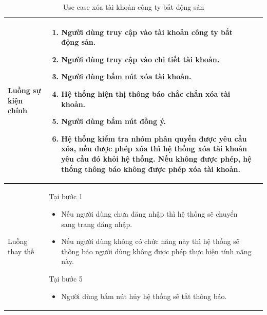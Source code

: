 \documentclass[12pt,a4paper]{article}
\begin{document}
\begin{table}[H]
\begin{tabular}{|p{3.5cm}|p{11.5cm}|c|}
            Luồng sự kiện chính & \vspace{-.8cm}\begin{enumerate}
                                                    \item Người dùng truy cập vào tài khoản công ty bất động sản.
                                                    \item Người dùng truy cập vào chi tiết tài khoản.
                                                    \item  Người dùng bấm nút xóa tài khoản.
                                                    \item  Hệ thống hiện thị thông báo chắc chắn xóa tài khoản.
                                                    \item  Người dùng bấm nút đồng ý.
                                                    \item Hệ thống kiểm tra nhóm phân quyền được yêu cầu xóa, nếu được phép xóa thì hệ thống xóa tài khoản yêu cầu đó khỏi hệ thống. Nếu không được phép, hệ thống thông báo không được phép xóa tài khoản.
            \end{enumerate}
            \\
            \hline
            Luồng thay thế & Tại bước 1\newline
            \vspace{-.8cm}\begin{itemize}
                              \item Nếu người dùng chưa đăng nhập thì hệ thống sẽ chuyển sang trang đăng nhập.
                              \item Nếu người dùng không có chức năng này thì hệ thống sẽ thông báo người dùng không được phép thực hiện tính năng này.
            \end{itemize}

            Tại bước 5\newline
            \vspace{-.8cm}\begin{itemize}
                              \item Người dùng bấm nút hủy hệ thống sẽ tắt thông báo.
            \end{itemize} \\
            \hline
        \end{tabular}
        \caption{Use case xóa tài khoản công ty bất động sản }

    \end{table}
\end{document}
